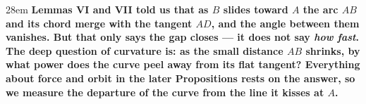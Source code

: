 \documentclass[border=4pt]{standalone}
\begin{document}
\begin{varwidth}{28em}
\large\bfseries
Lemmas VI and VII told us that as $B$ slides toward $A$ the arc $AB$      and its chord merge with the tangent $AD$, and the angle between them      vanishes. But that only says the gap closes — it does not say \textit{how fast}.      The deep question of curvature is: as the small distance $AB$ shrinks, by what      power does the curve peel away from its flat tangent? Everything about      force and orbit in the later Propositions rests on the answer, so we measure the      departure of the curve from the line it kisses at $A$.
\end{varwidth}
\end{document}
